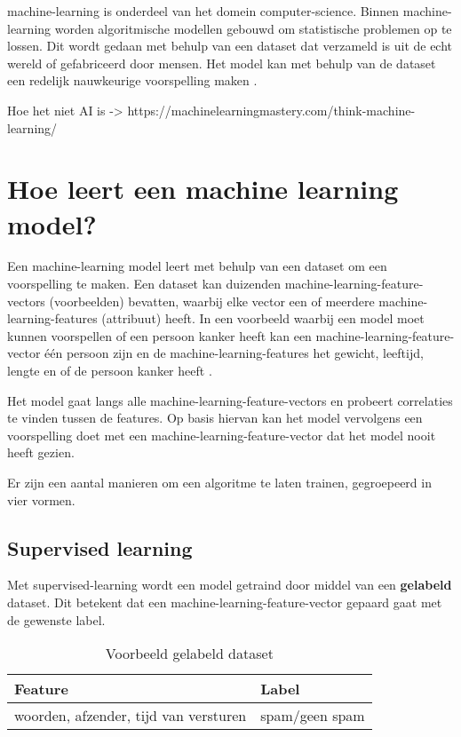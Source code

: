 
\Gls{machine-learning} is onderdeel van het domein \gls{computer-science}. Binnen \gls{machine-learning} worden algoritmische modellen gebouwd om statistische problemen op te lossen. Dit wordt gedaan met behulp van een dataset dat verzameld is uit de echt wereld of gefabriceerd door mensen. Het model kan met behulp van de dataset een redelijk nauwkeurige voorspelling maken \cite[p.~7]{the-hundred-page-machine-learning-book}.

Hoe het niet AI is -> https://machinelearningmastery.com/think-machine-learning/

\section{Hoe leert een machine learning model?}\label{sec:hoe-leert-een-machine-learning-model}
Een \gls{machine-learning} model leert met behulp van een dataset om een voorspelling te maken. Een dataset kan duizenden \glspl{machine-learning-feature-vector} (voorbeelden) bevatten, waarbij elke vector een of meerdere \glspl{machine-learning-feature} (attribuut) heeft. In een voorbeeld waarbij een model moet kunnen voorspellen of een persoon kanker heeft kan een \gls{machine-learning-feature-vector} één persoon zijn en de \glspl{machine-learning-feature} het gewicht, leeftijd, lengte en of de persoon kanker heeft \cite{google-ml-terminology}.

Het model gaat langs alle \glspl{machine-learning-feature-vector} en probeert correlaties te vinden tussen de features. Op basis hiervan kan het model vervolgens een voorspelling doet met een \gls{machine-learning-feature-vector} dat het model nooit heeft gezien.

Er zijn een aantal manieren om een algoritme te laten trainen, gegroepeerd in vier vormen.

\subsection{Supervised learning}\label{subsec:supervised-learning}
Met \gls{supervised-learning} wordt een model getraind door middel van een \textbf{gelabeld} dataset. Dit betekent dat een \gls{machine-learning-feature-vector} gepaard gaat met de gewenste label.

\begin{table}[hbt!]
  \centering
  \begin{tabular}{|l|l|}
  \hline
  \textbf{Feature} & \textbf{Label} \\ \hline
  woorden, afzender, tijd van versturen&spam/geen spam\\ \hline
  \end{tabular}
  \caption{Voorbeeld gelabeld dataset}
  \label{table:voorbeeld-gelabeld-dataset}
\end{table}

